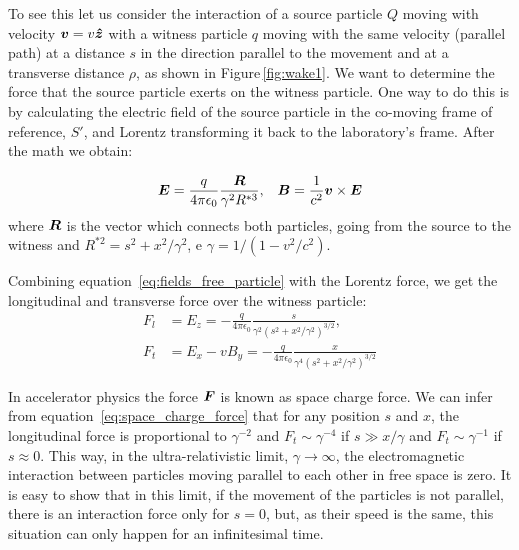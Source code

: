 \begin{apendicesenv}
    To see this let us consider the interaction of a source particle $Q$ moving with velocity $\boldsymbol{v}=v{\boldsymbol{\hat{z}}}$ with a witness particle $q$ moving with the same velocity (parallel path) at a distance $s$ in the direction parallel to the movement and at a transverse distance $\rho$, as shown in Figure\,\ref{fig:wake1}. We want to determine the force that the source particle exerts on the witness particle. One way to do this is by calculating the electric field of the source particle in the co-moving frame of reference, $S'$, and Lorentz transforming it back to the laboratory's frame. After the math we obtain:

    \begin{align}\label{eq:fields_free_particle}
    	\boldsymbol{E} = \frac{q}{4\pi\epsilon_0}\frac{\boldsymbol{R}}{\gamma^2 R^{*3}}, & & \boldsymbol{B} = \frac{1}{c^2}\boldsymbol{v} \times \boldsymbol{E}
    \end{align}
    where $\boldsymbol{R}$ is the vector which connects both particles, going from the source to the witness and  $R^{*2} = s^2 + x^2/\gamma^2$, e $\gamma = 1/(1-v^2/c^2)$.

    Combining equation~\eqref{eq:fields_free_particle} with the Lorentz force, we get the longitudinal and transverse force over the witness particle:
    \begin{align}\label{eq:space_charge_force}
    	F_l &= E_z = -\frac{q}{4\pi\epsilon_0}\frac{s}{\gamma^2\left(s^2+x^2/\gamma^2\right)^{3/2}}, \\
    	F_t &= E_x - vB_y = -\frac{q}{4\pi\epsilon_0}\frac{x}{\gamma^4\left(s^2+x^2/\gamma^2\right)^{3/2}}
    \end{align}

    In accelerator physics the force $\boldsymbol{F}$ is known as space charge force. We can infer from equation~\eqref{eq:space_charge_force} that for any position $s$ and $x$, the longitudinal force is proportional to $\gamma^{-2}$ and $F_t \sim \gamma^{-4}$ if $s \gg x/\gamma$ and  $F_t \sim \gamma^{-1}$ if $s \approx 0$. This way, in the ultra-relativistic limit, $\gamma \to \infty$, the electromagnetic interaction between particles moving parallel to each other in free space is zero. It is easy to show that in this limit, if the movement of the particles is not parallel, there is an interaction force only for $s=0$, but, as their speed is the same, this situation can only happen for an infinitesimal time.


\end{apendicesenv}
